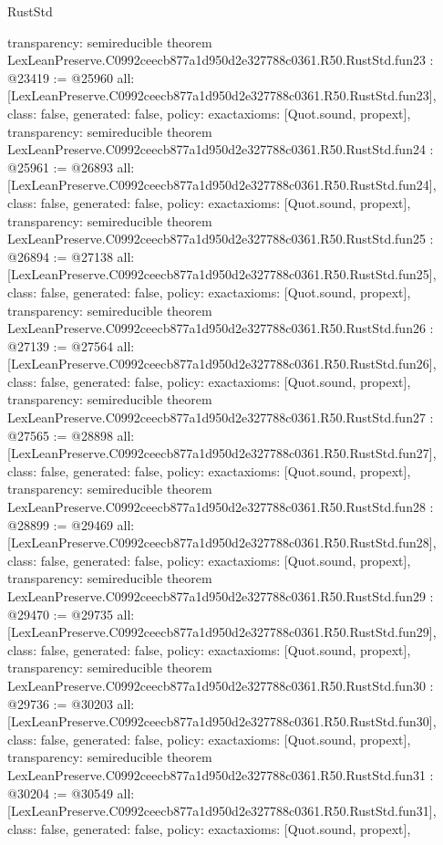 \begin{lexlean}{RustStd}
\begin{coremodule}
{  transparency: semireducible
}
theorem LexLeanPreserve.C0992ceecb877a1d950d2e327788c0361.R50.RustStd.fun23 : @23419 := @25960 {
  all: [LexLeanPreserve.C0992ceecb877a1d950d2e327788c0361.R50.RustStd.fun23],
  class: false,
  generated: false,
  policy: exact{axioms: [Quot.sound, propext]},
  transparency: semireducible
}
theorem LexLeanPreserve.C0992ceecb877a1d950d2e327788c0361.R50.RustStd.fun24 : @25961 := @26893 {
  all: [LexLeanPreserve.C0992ceecb877a1d950d2e327788c0361.R50.RustStd.fun24],
  class: false,
  generated: false,
  policy: exact{axioms: [Quot.sound, propext]},
  transparency: semireducible
}
theorem LexLeanPreserve.C0992ceecb877a1d950d2e327788c0361.R50.RustStd.fun25 : @26894 := @27138 {
  all: [LexLeanPreserve.C0992ceecb877a1d950d2e327788c0361.R50.RustStd.fun25],
  class: false,
  generated: false,
  policy: exact{axioms: [Quot.sound, propext]},
  transparency: semireducible
}
theorem LexLeanPreserve.C0992ceecb877a1d950d2e327788c0361.R50.RustStd.fun26 : @27139 := @27564 {
  all: [LexLeanPreserve.C0992ceecb877a1d950d2e327788c0361.R50.RustStd.fun26],
  class: false,
  generated: false,
  policy: exact{axioms: [Quot.sound, propext]},
  transparency: semireducible
}
theorem LexLeanPreserve.C0992ceecb877a1d950d2e327788c0361.R50.RustStd.fun27 : @27565 := @28898 {
  all: [LexLeanPreserve.C0992ceecb877a1d950d2e327788c0361.R50.RustStd.fun27],
  class: false,
  generated: false,
  policy: exact{axioms: [Quot.sound, propext]},
  transparency: semireducible
}
theorem LexLeanPreserve.C0992ceecb877a1d950d2e327788c0361.R50.RustStd.fun28 : @28899 := @29469 {
  all: [LexLeanPreserve.C0992ceecb877a1d950d2e327788c0361.R50.RustStd.fun28],
  class: false,
  generated: false,
  policy: exact{axioms: [Quot.sound, propext]},
  transparency: semireducible
}
theorem LexLeanPreserve.C0992ceecb877a1d950d2e327788c0361.R50.RustStd.fun29 : @29470 := @29735 {
  all: [LexLeanPreserve.C0992ceecb877a1d950d2e327788c0361.R50.RustStd.fun29],
  class: false,
  generated: false,
  policy: exact{axioms: [Quot.sound, propext]},
  transparency: semireducible
}
theorem LexLeanPreserve.C0992ceecb877a1d950d2e327788c0361.R50.RustStd.fun30 : @29736 := @30203 {
  all: [LexLeanPreserve.C0992ceecb877a1d950d2e327788c0361.R50.RustStd.fun30],
  class: false,
  generated: false,
  policy: exact{axioms: [Quot.sound, propext]},
  transparency: semireducible
}
theorem LexLeanPreserve.C0992ceecb877a1d950d2e327788c0361.R50.RustStd.fun31 : @30204 := @30549 {
  all: [LexLeanPreserve.C0992ceecb877a1d950d2e327788c0361.R50.RustStd.fun31],
  class: false,
  generated: false,
  policy: exact{axioms: [Quot.sound, propext]},
}
\end{coremodule}
\end{lexlean}

